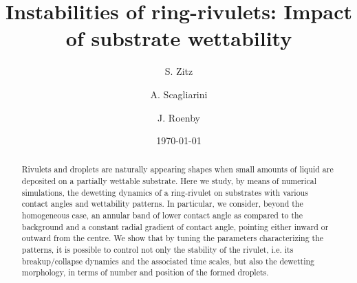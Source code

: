 \documentclass[%
 aip,
 amsmath,amssymb,
 reprint,%
]{revtex4-1}
\begin{document}


\title[]{Instabilities of ring-rivulets: Impact of substrate wettability}
\author{S. Zitz} 
%
\author{A. Scagliarini}%
%

\author{J. Roenby}
%

\date{\today}%

\begin{abstract}
\noindent Rivulets and droplets are naturally appearing shapes when small amounts of liquid are deposited on a partially wettable substrate.
Here we study, by means of numerical simulations, the dewetting dynamics of a ring-rivulet on substrates with various contact angles and wettability patterns.
In particular, we consider, beyond the homogeneous case, an annular band of lower contact angle as compared to the background and a constant radial gradient of contact angle, pointing either inward or outward from the centre. 
We show that by tuning the parameters characterizing the patterns, it is possible to control not only the stability of the rivulet, i.e. its breakup/collapse dynamics and 
the associated time scales, but also the dewetting morphology, in terms of number and position of the formed droplets.
\end{abstract}
\end{document}
